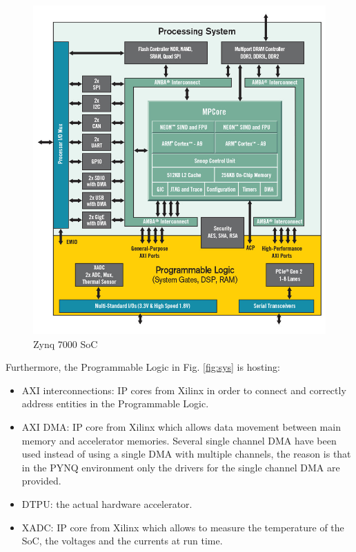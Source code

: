 \begin{figure}[!htbp]
\centering
\captionsetup{justification=centering}
\includegraphics[scale=0.35]{./figure/zynq.PNG}
\caption{Zynq 7000 SoC\cite{paper:42}}
\label{fig:zynq}
\end{figure}

Furthermore, the Programmable Logic in Fig. \ref{fig:sys} is hosting:
\begin{itemize}
\item AXI interconnections: IP cores from Xilinx\cite{paper:34}\cite{paper:35} in order to connect and correctly address entities in the Programmable Logic.
\item AXI DMA: IP core from Xilinx \cite{paper:33} which allows data movement between main memory and accelerator memories.  Several single channel DMA have been used instead of using a single DMA with multiple channels, the reason is that in the PYNQ environment only the drivers for the single channel DMA are provided. 
\item DTPU: the actual hardware accelerator.
\item XADC: IP core from Xilinx \cite{paper:32} which allows to measure the temperature of the SoC, the voltages and the currents at run time.

\end{itemize}

